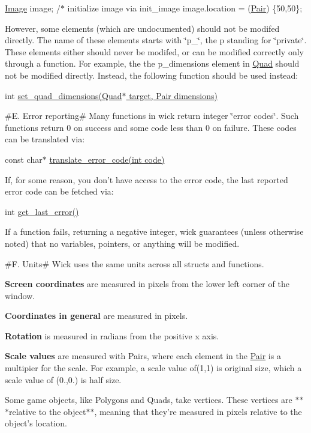 {\ttfamily \hyperlink{struct_image}{Image} image;} {\ttfamily /$\ast$ initialize image via init\-\_\-image} {\ttfamily image.\-location = (\hyperlink{struct_pair}{Pair}) \{50,50\};}

However, some elements (which are undocumented) should not be modifed directly. The name of these elements starts with \char`\"{}p\-\_\-\char`\"{}, the p standing for \char`\"{}private\char`\"{}. These elements either should never be modifed, or can be modified correctly only through a function. For example, the the p\-\_\-dimensions element in \hyperlink{struct_quad}{Quad} should not be modified directly. Instead, the following function should be used instead\-:

{\ttfamily int \hyperlink{quad_8h_a4564577609fd9008e7883db2fb210109}{set\-\_\-quad\-\_\-dimensions(\-Quad$\ast$ target, Pair dimensions)}}

\#\-E. Error reporting\# Many functions in wick return integer \char`\"{}error codes\char`\"{}. Such functions return 0 on success and some code less than 0 on failure. These codes can be translated via\-:

{\ttfamily const char$\ast$ \hyperlink{error_8h_a8af34de9e5f9e832e17e37f775319796}{translate\-\_\-error\-\_\-code(int code)}}

If, for some reason, you don't have access to the error code, the last reported error code can be fetched via\-:

{\ttfamily int \hyperlink{error_8h_a92540a3cba575aec179ef8453725ecd1}{get\-\_\-last\-\_\-error()}}

If a function fails, returning a negative integer, wick guarantees (unless otherwise noted) that no variables, pointers, or anything will be modified.

\#\-F. Units\# Wick uses the same units across all structs and functions.

{\bfseries Screen coordinates} are measured in pixels from the lower left corner of the window.

{\bfseries Coordinates in general} are measured in pixels.

{\bfseries Rotation} is measured in radians from the positive x axis.

{\bfseries Scale values} are measured with Pairs, where each element in the \hyperlink{struct_pair}{Pair} is a multipier for the scale. For example, a scale value of(1,1) is original size, which a scale value of (0.,0.) is half size.

Some game objects, like Polygons and Quads, take vertices. These vertices are $\ast$$\ast$$\ast$relative to the object$\ast$$\ast$, meaning that they're measured in pixels relative to the object's location. 